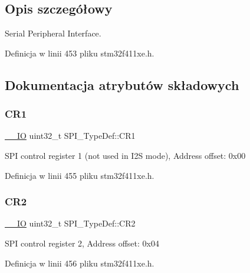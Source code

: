 \subsection{Opis szczegółowy}
Serial Peripheral Interface. 

Definicja w linii 453 pliku stm32f411xe.\+h.



\subsection{Dokumentacja atrybutów składowych}
\mbox{\label{struct_s_p_i___type_def_a6ecd5cb63b85c381bd67dc90dd4f573a}} 
\subsubsection{\texorpdfstring{C\+R1}{CR1}}
{\footnotesize\ttfamily \hyperlink{core__sc300_8h_aec43007d9998a0a0e01faede4133d6be}{\+\_\+\+\_\+\+IO} uint32\+\_\+t S\+P\+I\+\_\+\+Type\+Def\+::\+C\+R1}

S\+PI control register 1 (not used in I2S mode), Address offset\+: 0x00 

Definicja w linii 455 pliku stm32f411xe.\+h.

\mbox{\label{struct_s_p_i___type_def_a38cb89a872e456e6ecd29b6c71d85600}} 
\subsubsection{\texorpdfstring{C\+R2}{CR2}}
{\footnotesize\ttfamily \hyperlink{core__sc300_8h_aec43007d9998a0a0e01faede4133d6be}{\+\_\+\+\_\+\+IO} uint32\+\_\+t S\+P\+I\+\_\+\+Type\+Def\+::\+C\+R2}

S\+PI control register 2, Address offset\+: 0x04 

Definicja w linii 456 pliku stm32f411xe.\+h.

\mbox{\label{struct_s_p_i___type_def_a609d2a279b1927846a991deb9d0dc0b0}} 
